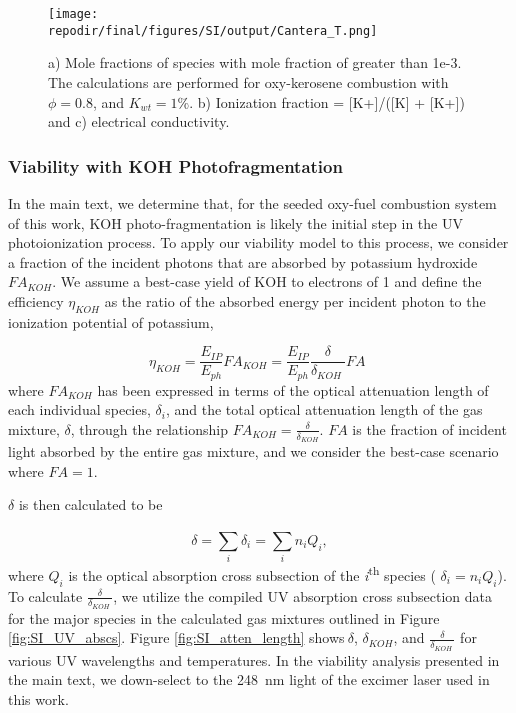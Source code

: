 \begin{figure}[ht]
    \centering
    \texttt{[image: \\repodir/final/figures/SI/output/Cantera\_T.png]}
    \caption{a) Mole fractions of species with mole fraction of greater than 1e-3. The calculations are performed for oxy-kerosene combustion with \(\phi = 0.8\), and \(K_{wt} = 1\%\). b) Ionization fraction = {[}K+{]}/({[}K{]} + {[}K+{]}) and c) electrical conductivity.}
    \label{fig:SI_Cantera_T}
\end{figure} 


\hypertarget{photoionization}{%
\subsubsection{Viability with KOH Photofragmentation}\label{photoionization}}

In the main text, we determine that, for the seeded oxy-fuel combustion system of this work, KOH photo-fragmentation is likely the initial step in the UV photoionization process. To apply our viability model to this process, we consider a fraction of the incident photons that are absorbed by potassium hydroxide \(FA_{KOH}\). We assume a best-case yield of KOH to electrons of 1 and define the efficiency $\eta_{KOH}$ as the ratio of the absorbed energy per incident photon to the ionization potential of potassium,

\begin{equation}
\eta_{KOH} = \frac{E_{IP}}{E_{ph}}FA_{KOH} = \frac{E_{IP}}{E_{ph}}\frac{\delta}{\delta_{KOH}\ }FA\ \,
\end{equation}
where \(FA_{KOH}\) has been expressed in terms of the optical attenuation length of each individual species, \(\delta_{i}\), and the total optical attenuation length of the gas mixture, \(\delta\), through the relationship $FA_{KOH} = \frac{\delta}{\delta_{KOH}}$. $FA$ is the fraction of incident light absorbed by the entire gas mixture, and we consider the best-case scenario where $FA = 1$. 

\(\delta\) is then calculated to be

\begin{equation}
\delta = \sum_{i}^{}\delta_{i} = \sum_{i}^{}{n_{i}Q_{i}},
\end{equation}
where \(Q_{i}\) is the optical absorption cross subsection of the \emph{i}\textsuperscript{th} species ( \(\delta_{i} = n_{i}Q_{i}\)). To calculate \(\frac{\delta}{\delta_{KOH}\ }\), we utilize the compiled UV absorption cross subsection data for the major species in the calculated gas mixtures outlined in Figure \ref{fig:SI_UV_abscs}. Figure \ref{fig:SI_atten_length} shows\(\ \delta\), \(\delta_{KOH}\), and \(\frac{\delta}{\delta_{KOH}\ }\) for various UV wavelengths and temperatures. In the viability analysis presented in the main text, we down-select to the \SI{248}{\nano\meter} light of the excimer laser used in this work.

